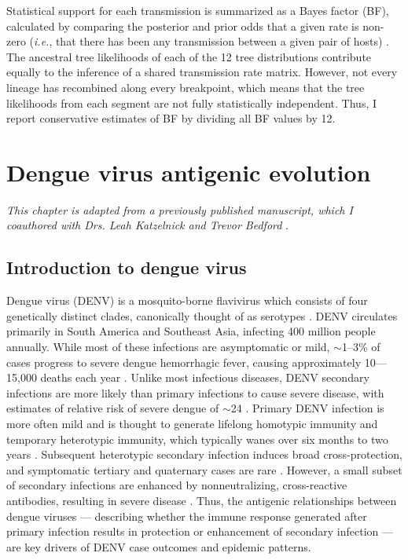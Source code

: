 Statistical support for each transmission is summarized as a Bayes factor (BF), calculated by comparing the posterior and prior odds that a given rate is non-zero (\textit{i.e.}, that there has been any transmission between a given pair of hosts) \citep{lemey2009bayesian}.
The ancestral tree likelihoods of each of the 12 tree distributions contribute equally to the inference of a shared transmission rate matrix.
However, not every lineage has recombined along every breakpoint, which means that the tree likelihoods from each segment are not fully statistically independent.
Thus, I report conservative estimates of BF by dividing all BF values by 12.



\chapter{Dengue virus antigenic evolution}
\textit{This chapter is adapted from a previously published manuscript, which I coauthored with Drs. Leah Katzelnick and Trevor Bedford }\citep{bell2018dengue}.

\section{Introduction to dengue virus}
Dengue virus (DENV) is a mosquito-borne flavivirus which consists of four genetically distinct clades, canonically thought of as serotypes \citep{lanciotti1997molecular}.
DENV circulates primarily in South America and Southeast Asia, infecting 400 million people annually.
While most of these infections are asymptomatic or mild, $\sim$1--3\% of cases progress to severe dengue hemorrhagic fever, causing approximately 10---15,000 deaths each year \citep{bhatt2013global}.
Unlike most infectious diseases, DENV secondary infections are more likely than primary infections to cause severe disease, with estimates of relative risk of severe dengue of $\sim$24 \citep{mizumoto2014risk}.
Primary DENV infection is more often mild and is thought to generate lifelong homotypic immunity and temporary heterotypic immunity, which typically wanes over six months to two years \citep{katzelnick2016neutralizing,sabin1952research}.
Subsequent heterotypic secondary infection induces broad cross-protection, and symptomatic tertiary and quaternary cases are rare  \citep{gibbons2007analysis,olkowski2013reduced}.
However, a small subset of secondary infections are enhanced by nonneutralizing, cross-reactive antibodies, resulting in severe disease \citep{halstead1979vivo,katzelnick2017antibody,sangkawibha1984risk}.
Thus, the antigenic relationships between dengue viruses --- describing whether the immune response generated after primary infection results in protection or enhancement of secondary infection --- are key drivers of DENV case outcomes and epidemic patterns.

